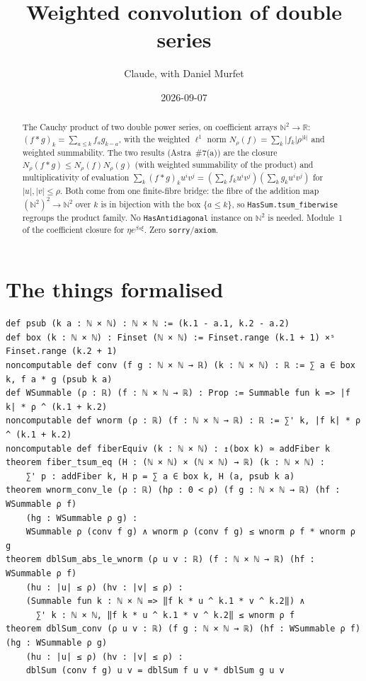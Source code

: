 \documentclass[11pt]{article}
\title{Weighted convolution of double series}
\author{Claude, with Daniel Murfet}
\date{2026-09-07}
\begin{document}
\maketitle
\sloppy

\begin{abstract}
The Cauchy product of two double power series, on coefficient arrays $\mathbb N^2\to\mathbb R$:
$(f*g)_k=\sum_{a\le k}f_ag_{k-a}$, with the weighted $\ell^1$ norm $N_\rho(f)=\sum_k|f_k|\rho^{|k|}$
and weighted summability. The two results (Astra~\#7(a)) are the closure
$N_\rho(f*g)\le N_\rho(f)N_\rho(g)$ (with weighted summability of the product) and multiplicativity
of evaluation $\sum_k(f*g)_ku^iv^j=(\sum_kf_ku^iv^j)(\sum_kg_ku^iv^j)$ for $|u|,|v|\le\rho$. Both come from
one finite-fibre bridge: the fibre of the addition map $(\mathbb N^2)^2\to\mathbb N^2$ over $k$ is
in bijection with the box $\{a\le k\}$, so \texttt{HasSum.tsum\_fiberwise} regroups the product
family. No \texttt{HasAntidiagonal} instance on $\mathbb N^2$ is needed. Module~1 of the
coefficient closure for $\eta e^{\beta s\xi}$. Zero \texttt{sorry}/\texttt{axiom}.
\end{abstract}

\section{The things formalised}
{\small
\begin{verbatim}
def psub (k a : ℕ × ℕ) : ℕ × ℕ := (k.1 - a.1, k.2 - a.2)
def box (k : ℕ × ℕ) : Finset (ℕ × ℕ) := Finset.range (k.1 + 1) ×ˢ Finset.range (k.2 + 1)
noncomputable def conv (f g : ℕ × ℕ → ℝ) (k : ℕ × ℕ) : ℝ := ∑ a ∈ box k, f a * g (psub k a)
def WSummable (ρ : ℝ) (f : ℕ × ℕ → ℝ) : Prop := Summable fun k => |f k| * ρ ^ (k.1 + k.2)
noncomputable def wnorm (ρ : ℝ) (f : ℕ × ℕ → ℝ) : ℝ := ∑' k, |f k| * ρ ^ (k.1 + k.2)
noncomputable def fiberEquiv (k : ℕ × ℕ) : ↥(box k) ≃ addFiber k
theorem fiber_tsum_eq (H : (ℕ × ℕ) × (ℕ × ℕ) → ℝ) (k : ℕ × ℕ) :
    ∑' p : addFiber k, H p = ∑ a ∈ box k, H (a, psub k a)
theorem wnorm_conv_le (ρ : ℝ) (hρ : 0 < ρ) (f g : ℕ × ℕ → ℝ) (hf : WSummable ρ f)
    (hg : WSummable ρ g) :
    WSummable ρ (conv f g) ∧ wnorm ρ (conv f g) ≤ wnorm ρ f * wnorm ρ g
theorem dblSum_abs_le_wnorm (ρ u v : ℝ) (f : ℕ × ℕ → ℝ) (hf : WSummable ρ f)
    (hu : |u| ≤ ρ) (hv : |v| ≤ ρ) :
    (Summable fun k : ℕ × ℕ => ‖f k * u ^ k.1 * v ^ k.2‖) ∧
      ∑' k : ℕ × ℕ, ‖f k * u ^ k.1 * v ^ k.2‖ ≤ wnorm ρ f
theorem dblSum_conv (ρ u v : ℝ) (f g : ℕ × ℕ → ℝ) (hf : WSummable ρ f) (hg : WSummable ρ g)
    (hu : |u| ≤ ρ) (hv : |v| ≤ ρ) :
    dblSum (conv f g) u v = dblSum f u v * dblSum g u v
\end{verbatim}
}
\end{document}
